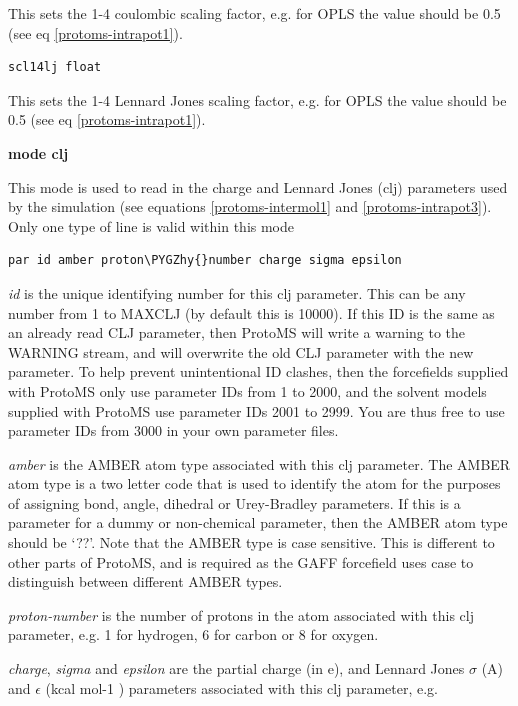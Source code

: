\documentclass[letterpaper,10pt,english]{sphinxmanual}
\def\PYGZhy{\char`\-}
\begin{document}
This sets the 1-4 coulombic scaling factor, e.g. for OPLS the value should be 0.5 (see eq \eqref{protoms-intrapot1}).

\begin{Verbatim}[commandchars=\\\{\}]
scl14lj float
\end{Verbatim}

This sets the 1-4 Lennard Jones scaling factor, e.g. for OPLS the value should be 0.5 (see eq \eqref{protoms-intrapot1}).

\textbf{mode clj}

This mode is used to read in the charge and Lennard Jones (clj) parameters used by the simulation (see equations \eqref{protoms-intermol1} and \eqref{protoms-intrapot3}). Only one type of line is valid within this mode

\begin{Verbatim}[commandchars=\\\{\}]
par id amber proton\PYGZhy{}number charge sigma epsilon
\end{Verbatim}

\emph{id} is the unique identifying number for this clj parameter. This can be any number from 1 to MAXCLJ (by default this is 10000). If this ID is the same as an already read CLJ parameter, then ProtoMS will write a warning to the WARNING stream, and will overwrite the old CLJ parameter with the new parameter. To help prevent unintentional ID clashes, then the forcefields supplied with ProtoMS only use parameter IDs from 1 to 2000, and the solvent models supplied with ProtoMS use parameter IDs 2001 to 2999. You are thus free to use parameter IDs from 3000 in your own parameter files.

\emph{amber} is the AMBER atom type associated with this clj parameter. The AMBER atom type is a two letter code that is used to identify the atom for the purposes of assigning bond, angle, dihedral or Urey-Bradley parameters. If this is a parameter for a dummy or non-chemical parameter, then the AMBER atom type should be ‘??’. Note that the AMBER type is case sensitive. This is different to other parts of ProtoMS, and is required as the GAFF forcefield uses case to distinguish between different AMBER types.

\emph{proton-number} is the number of protons in the atom associated with this clj parameter, e.g. 1 for hydrogen, 6 for carbon or 8 for oxygen.

\emph{charge}, \emph{sigma} and \emph{epsilon} are the partial charge (in \textbar{}e\textbar{}), and Lennard Jones \(\sigma\) (A) and \(\epsilon\) (kcal mol-1 ) parameters associated with this clj parameter, e.g.
\end{document}
